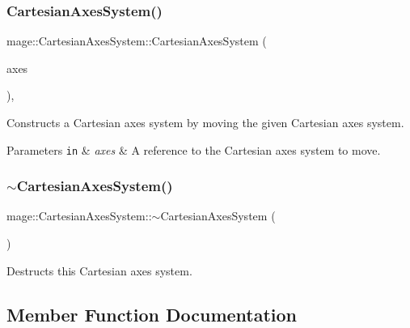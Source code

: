 \subsubsection{\texorpdfstring{Cartesian\+Axes\+System()}{CartesianAxesSystem()}\hspace{0.1cm}{\footnotesize\ttfamily [6/6]}}
{\footnotesize\ttfamily mage\+::\+Cartesian\+Axes\+System\+::\+Cartesian\+Axes\+System (\begin{DoxyParamCaption}\item[{\hyperlink{structmage_1_1_cartesian_axes_system}{Cartesian\+Axes\+System} \&\&}]{axes }\end{DoxyParamCaption})\hspace{0.3cm}{\ttfamily [default]}, {\ttfamily [noexcept]}}

Constructs a Cartesian axes system by moving the given Cartesian axes system.


\begin{DoxyParams}[1]{Parameters}
\mbox{\tt in}  & {\em axes} & A reference to the Cartesian axes system to move. \\
\hline
\end{DoxyParams}
\hypertarget{structmage_1_1_cartesian_axes_system_a8c32f25e03757c03506d9a93bddf5d13}{}\label{structmage_1_1_cartesian_axes_system_a8c32f25e03757c03506d9a93bddf5d13} 
\subsubsection{\texorpdfstring{$\sim$\+Cartesian\+Axes\+System()}{~CartesianAxesSystem()}}
{\footnotesize\ttfamily mage\+::\+Cartesian\+Axes\+System\+::$\sim$\+Cartesian\+Axes\+System (\begin{DoxyParamCaption}{ }\end{DoxyParamCaption})\hspace{0.3cm}{\ttfamily [default]}}

Destructs this Cartesian axes system. 

\subsection{Member Function Documentation}
\hypertarget{structmage_1_1_cartesian_axes_system_ac875736787757e685c166db671cc91f6}{}\label{structmage_1_1_cartesian_axes_system_ac875736787757e685c166db671cc91f6} 
